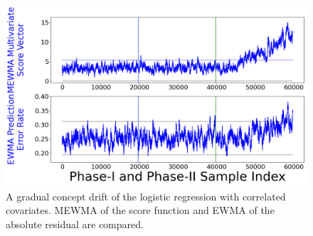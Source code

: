 \documentclass[twoside,11pt]{article}
\begin{document}
\begin{appendices}
\begin{figure}[!htbp]
\centering
\includegraphics[width = 0.8\linewidth]{../figures/v14/sim_7/logi_small/1_sim7_logi_1e-08_0_005_1.png}
  \caption{A gradual concept drift of the logistic regression with correlated covariates. MEWMA of the score function and EWMA of the absolute residual are compared.}
  \label{fig:log_reg_ind_X_grad_cd_comp}
\end{figure}



\end{appendices}
\end{document}
